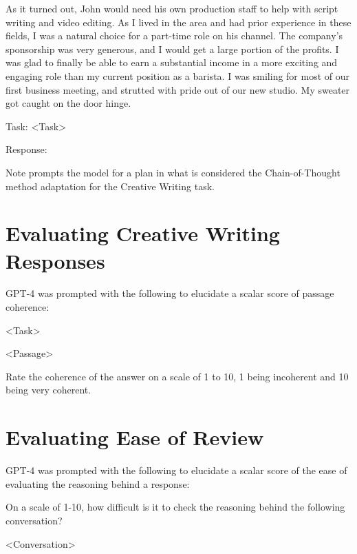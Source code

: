 \documentclass[11pt]{article}
\begin{document}
As it turned out, John would need his own production staff to help with script writing and video editing. As I lived in the area and had prior experience in these fields, I was a natural choice for a part-time role on his channel. The company's sponsorship was very generous, and I would get a large portion of the profits. I was glad to finally be able to earn a substantial income in a more exciting and engaging role than my current position as a barista. I was smiling for most of our first business meeting, and strutted with pride out of our new studio. My sweater got caught on the door hinge.

Task: <Task>

Response:

Note \citealp{yao_tree_2023} prompts the model for a plan in what is considered the Chain-of-Thought method adaptation for the Creative Writing task.

\section{Evaluating Creative Writing Responses}
\label{sec:evaluating_creative_writing}

GPT-4 was prompted with the following to elucidate a scalar score of passage coherence:

<Task>

<Passage>

Rate the coherence of the answer on a scale of 1 to 10, 1 being incoherent and 10 being very coherent.

\section{Evaluating Ease of Review}
\label{sec:evaluating_ease_of_review}

GPT-4 was prompted with the following to elucidate a scalar score of the ease of evaluating the reasoning behind a response:

On a scale of 1-10, how difficult is it to check the reasoning behind the following conversation?

<Conversation>
\end{document}
